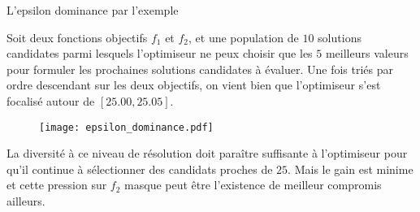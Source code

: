 \begin{testiv}{L'epsilon dominance par l'exemple}{}

Soit deux fonctions objectifs $f_1$ et $f_2$, et une population de $10$ solutions candidates parmi lesquels l'optimiseur ne peux choisir que les $5$ meilleurs valeurs pour formuler les prochaines solutions candidates à évaluer. Une fois triés par ordre descendant sur les deux objectifs, on vient bien que l'optimiseur s'est focalisé autour de $[25.00, 25.05]$.

\begin{figure}[H]
	 \centering
	 	\texttt{[image: epsilon\_dominance.pdf]}
	 	\label{fig:epsilon}
\end{figure}

La diversité à ce niveau de résolution doit paraître suffisante à l'optimiseur pour qu'il continue à sélectionner des candidats proches de $25$. Mais le gain est minime et cette pression sur $f_{2}$ masque peut être l'existence de meilleur compromis ailleurs.

\begin{table}[H]
	\centering
		\begin{minipage}{0.4\textwidth}
			\centering
		 \end{minipage}\hspace{0.2em}
		 \begin{minipage}{0.4\textwidth}
			\centering
		\end{minipage}
\end{table}


\end{testiv}
